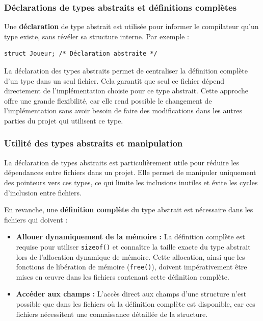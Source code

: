 \documentclass[a4paper,12pt]{report}
\begin{document}
\subsubsection*{Déclarations de types abstraits et définitions complètes}
Une \textbf{déclaration} de type abstrait est utilisée pour informer le compilateur qu'un type existe, sans révéler sa structure interne. Par exemple :
\begin{verbatim}
struct Joueur; /* Déclaration abstraite */
\end{verbatim}

La déclaration des types abstraits permet de centraliser la définition complète d'un type dans un seul fichier. 
Cela garantit que seul ce fichier dépend directement de l'implémentation choisie pour ce type abstrait. Cette approche offre une grande flexibilité, 
car elle rend possible le changement de l'implémentation sans avoir besoin de faire des modifications dans les autres parties du projet qui utilisent 
ce type.


\subsubsection*{Utilité des types abstraits et manipulation}

La déclaration de types abstraits est particulièrement utile pour réduire les dépendances entre fichiers dans un projet. Elle permet de manipuler 
uniquement des pointeurs vers ces types, ce qui limite les inclusions inutiles et évite les cycles d'inclusion entre fichiers.

En revanche, une \textbf{définition complète} du type abstrait est nécessaire dans les fichiers qui doivent :  
\begin{itemize}
    \item \textbf{Allouer dynamiquement de la mémoire :} La définition complète est requise pour utiliser \texttt{sizeof()} et connaître la taille 
    exacte du type abstrait lors de l'allocation dynamique de mémoire. Cette allocation, ainsi que les fonctions de libération de mémoire (\texttt{free()}), 
    doivent impérativement être mises en œuvre dans les fichiers contenant cette définition complète.
    \item \textbf{Accéder aux champs :} L'accès direct aux champs d'une structure n'est possible que dans les fichiers où la définition complète est 
    disponible, car ces fichiers nécessitent une connaissance détaillée de la structure.
\end{itemize}
\end{document}
